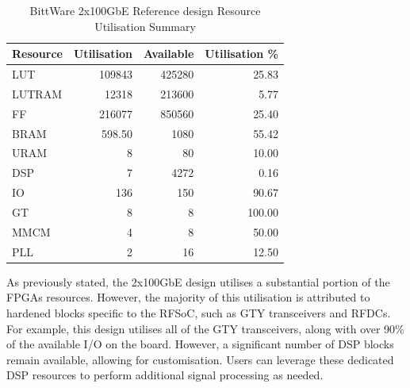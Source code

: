\documentclass[12pt, a4paper]{article}
\begin{document}
\begin{table}[h]
    \centering
    \begin{tabular}{|l|r|r|r|}
        \hline
        \textbf{Resource} & \textbf{Utilisation} & \textbf{Available} & \textbf{Utilisation \%} \\
        \hline
        LUT    & 109843  & 425280  & 25.83  \\\hline
        LUTRAM & 12318   & 213600  & 5.77   \\\hline
        FF     & 216077  & 850560  & 25.40  \\\hline
        BRAM   & 598.50  & 1080    & 55.42  \\\hline
        URAM   & 8       & 80      & 10.00  \\\hline
        DSP    & 7       & 4272    & 0.16   \\\hline
        IO     & 136     & 150     & 90.67  \\\hline
        GT     & 8       & 8       & 100.00 \\\hline
        MMCM   & 4       & 8       & 50.00  \\\hline
        PLL    & 2       & 16      & 12.50  \\
        \hline
    \end{tabular}
    \caption{BittWare 2x100GbE Reference design Resource Utilisation Summary}
    \label{tab:resource_utilization_RFX}
\end{table}

As previously stated, the 2x100GbE design utilises a substantial portion of the FPGAs resources. However, the majority of this utilisation is attributed to hardened blocks specific to the RFSoC, such as GTY transceivers and RFDCs. For example, this design utilises all of the GTY transceivers, along with over 90\% of the available I/O on the board. However, a significant number of DSP blocks remain available, allowing for customisation. Users can leverage these dedicated DSP resources to perform additional signal processing as needed.
\end{document}
